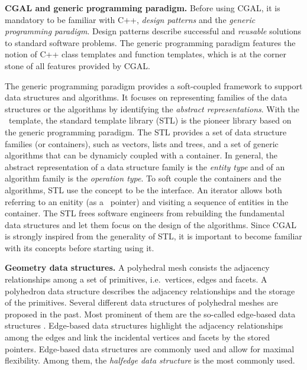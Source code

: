 
\noindent \textbf{CGAL and generic programming paradigm.}
Before using CGAL, it is mandatory to be familiar with C++,
\emph{design patterns} and the \emph{generic programming paradigm}. 
Design patterns \cite{Gamma:1995:DP} describe successful and
\emph{reusable} solutions to standard software problems. The generic
programming paradigm \cite{Alexandrescu:2001:MCD} features the notion
of C++ class templates and function templates, which is at the corner
stone of all features provided by CGAL. 

The generic programming paradigm provides a
soft-coupled framework to support data structures and algorithms. 
It focuses on representing families of the data structures 
or the algorithms by identifying 
the \emph{abstract representations}.
With the \CC\ template, the standard template library
\cite{ms-stl-96} (STL) is the pioneer library based on
the generic programming paradigm. The STL provides a set of 
data structure families (or containers), such as vectors, 
lists and trees, and a set of generic algorithms 
that can be dynamicly coupled with a container. In general, 
the abstract representation of a data structure family
is the \emph{entity type} and of an algorithm family
is the \emph{operation type}. 
To soft couple the containers and the algorithms, STL 
use the  concept to be the interface.
An iterator allows both referring to an enitity (as a \CC\ pointer) 
and visiting a sequence of entities in the container.
The STL frees software engineers from rebuilding the fundamental 
data structures and let them focus on the design of the algorithms.
Since CGAL is strongly inspired
from the generality of STL, it is important to become familiar with
its concepts before starting using it.

\noindent \textbf{Geometry data structures.}
A polyhedral mesh consists the adjacency relationships
among a set of primitives, i.e.\ vertices, edges and 
facets. A polyhedron data structure describes 
the adjacency relationships and the storage of the
primitives. Several different data structures
of polyhedral meshes are proposed in the past.
Most prominent of them are the so-called
edge-based data structures 
\cite{Weiler:1985:EDS,Baumgart:1975:PRCV,Guibas:1983:PMG}.
Edge-based data structures highlight the
adjacency relationships among the edges
and link the incidental vertices and facets
by the stored pointers. Edge-based data structures
are commonly used and allow for maximal flexibility.
Among them, the \emph{halfedge data structure} is the most
commonly used. 

